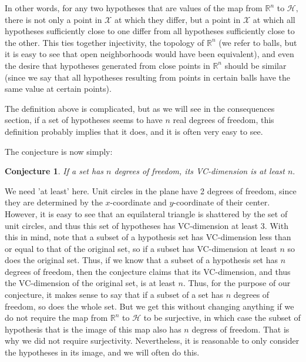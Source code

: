 \documentclass[12pt]{amsart}
\newcommand{\0}{\mat{0}}
\newcommand{\1}{\mathds{1}}
\newtheorem{conjecture}[theorem]{Conjecture}
\begin{document}
In other words, for any two hypotheses that are values of the map from $\mathbb{R}^n$ to $\mathcal{H},$ there is not only a point in $\mathcal{X}$ at which they differ, but a point in $\mathcal{X}$ at which all hypotheses sufficiently close to one differ from all hypotheses sufficiently close to the other. This ties together injectivity, the topology of $\mathbb{R}^n$ (we refer to balls, but it is easy to see that open neighborhoods would have been equivalent), and even the desire that hypotheses generated from close points in $\mathbb{R}^n$ should be similar (since we say that all hypotheses resulting from points in certain balls have the same value at certain points).

The definition above is complicated, but as we will see in the consequences section, if a set of hypotheses seems to have $n$ real degrees of freedom, this definition probably implies that it does, and it is often very easy to see.

The conjecture is now simply:
\begin{conjecture}
If a set has $n$ degrees of freedom, its VC-dimension is at least $n.$
\end{conjecture}
We need 'at least' here. Unit circles in the plane have 2 degrees of freedom, since they are determined by the $x$-coordinate and $y$-coordinate of their center. However, it is easy to see that an equilateral triangle is shattered by the set of unit circles, and thus this set of hypotheses has VC-dimension at least 3. With this in mind, note that a subset of a hypothesis set has VC-dimension less than or equal to that of the original set, so if a subset has VC-dimension at least $n$ so does the original set. Thus, if we know that a subset of a hypothesis set has $n$ degrees of freedom, then the conjecture claims that its VC-dimension, and thus the VC-dimension of the original set, is at least $n.$ Thus, for the purpose of our conjecture, it makes sense to say that if a subset of a set has $n$ degrees of freedom, so does the whole set. But we get this without changing anything if we do not require the map from $\mathbb{R}^n$ to $\mathcal{H}$ to be surjective, in which case the subset of hypothesis that is the image of this map also has $n$ degress of freedom. That is why we did not require surjectivity. Nevertheless, it is reasonable to only consider the hypotheses in its image, and we will often do this.
\end{document}
